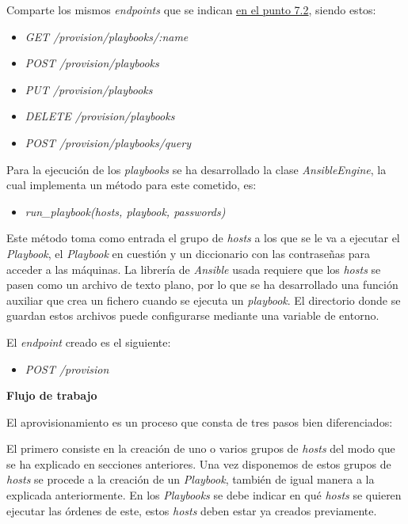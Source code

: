 \bigskip
Comparte los mismos \textit{endpoints} que se indican \hyperref[sec:servicios]{en el punto 7.2}, siendo estos:
\begin{itemize}
	\item \textit{GET /provision/playbooks/:name}
	\item \textit{POST /provision/playbooks}
	\item \textit{PUT /provision/playbooks}
	\item \textit{DELETE /provision/playbooks}
	\item \textit{POST /provision/playbooks/query}
\end{itemize}

\bigskip
Para la ejecución de los \textit{playbooks} se ha desarrollado la clase \textit{AnsibleEngine}, la cual implementa un método para este cometido, es:
\begin{itemize}
	\item \textit{run\_playbook(hosts, playbook, passwords)}
\end{itemize}

\bigskip
Este método toma como entrada el grupo de \textit{hosts} a los que se le va a ejecutar el \textit{Playbook}, el \textit{Playbook} en cuestión y un diccionario con las contraseñas para acceder a las máquinas. La librería de \textit{Ansible} usada requiere que los \textit{hosts} se pasen como un archivo de texto plano, por lo que se ha desarrollado una función auxiliar que crea un fichero cuando se ejecuta un \textit{playbook}. El directorio donde se guardan estos archivos puede configurarse mediante una variable de entorno.



\bigskip
El \textit{endpoint} creado es el siguiente:
\begin{itemize}
	\item \textit{POST /provision}
\end{itemize}


\bigskip
\textbf{Flujo de trabajo}

El aprovisionamiento es un proceso que consta de tres pasos bien diferenciados:

El primero consiste en la creación de uno o varios grupos de \textit{hosts} del modo que se ha explicado en secciones anteriores. Una vez disponemos de estos grupos de \textit{hosts} se procede a la creación de un \textit{Playbook}, también de igual manera a la explicada anteriormente. En los \textit{Playbooks} se debe indicar en qué \textit{hosts} se quieren ejecutar las órdenes de este, estos \textit{hosts} deben estar ya creados previamente.

